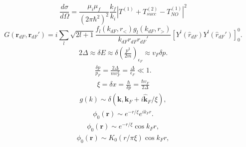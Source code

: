\documentclass[a4paper,11pt]{book}
\numberwithin{equation}{section}
\numberwithin{figure}{section}
\numberwithin{table}{section}
\begin{document}
\begin{equation}
\frac{d\sigma}{d\Omega}=\frac{\mu_i\mu_f}{\left(2\pi\hbar^2\right)^2}\frac{k_f}{k_i}\left|T^{(1)}+T^{(2)}_{succ}-T^{(1)}_{NO}\right|^2
\end{equation}
\begin{equation}\label{eq7_1_12}
G(\mathbf{r}_{dF},\mathbf{r}_{dF}')=i\sum_{l}\sqrt{2l+1}
\frac{f_{l}(k_{dF},r_<)g_{l}(k_{dF},r_>)}{k_{dF}r_{dF}r_{dF}'}
\left[  Y^{l} (\hat r_{dF}) Y^{l} (\hat r_{dF}')\right]_0^0.
\end{equation}
\newpage 
\begin{align*}
2\Delta\approx\delta E\approx\delta \left(\frac{p^2}{2m}\right)_{\epsilon_F}\approx v_F\delta p.
\end{align*}
\vspace{1.2cm}
\begin{align*}
\frac{\delta p}{p_F}=\frac{2\Delta}{mv_F^2}=\frac{\Delta}{\epsilon_F}\ll1.
\end{align*}
\vspace{1.2cm}
\begin{align*}
\xi=\delta x=\frac{\hbar}{\delta p}=\frac{\hbar v_F}{2\Delta}
\end{align*}
\vspace{1.2cm}
\begin{align*}
g(k)\sim\delta(\mathbf k,\mathbf k_F+i\mathbf{\hat k}_F/\xi),
\end{align*}
\vspace{1.2cm}
\begin{align*}
\phi_0(\mathbf r)\sim e^{-r/\xi}e^{ik_Fr}.
\end{align*}
\vspace{1.2cm}
\begin{align*}
\phi_0(\mathbf r)\sim e^{-r/\xi}\cos k_Fr,
\end{align*}
\vspace{1.2cm}
\begin{align*}
\phi_0(\mathbf r)\sim K_0(r/\pi\xi)\cos k_Fr,
\end{align*}
\newpage
\end{document}

